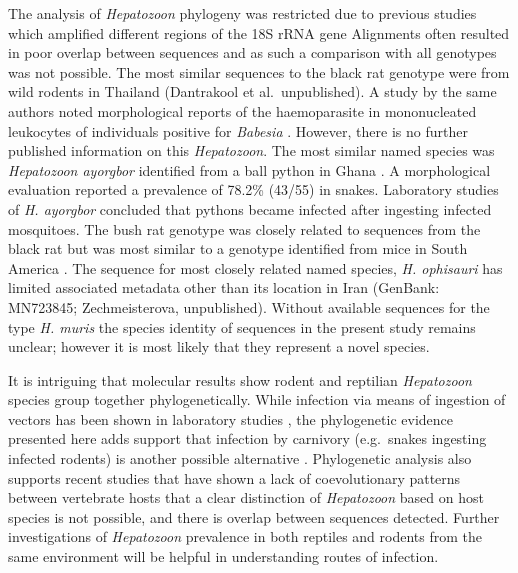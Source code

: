 \documentclass[a4paper, nobind]{templates/ociamthesis}
\begin{document}
The analysis of \emph{Hepatozoon} phylogeny was restricted due to previous studies which amplified different regions of the 18S rRNA gene
Alignments often resulted in poor overlap between sequences and as such a comparison with all genotypes was not possible.
The most similar sequences to the black rat genotype were from wild rodents in Thailand (Dantrakool et al.~unpublished).
A study by the same authors noted morphological reports of the haemoparasite in mononucleated leukocytes of individuals positive for \emph{Babesia} \autocite{dantrakoolIdentificationNewType2004}.
However, there is no further published information on this \emph{Hepatozoon}. The most similar named species was \emph{Hepatozoon ayorgbor} identified from a ball python in Ghana \autocite{slobodaNEWSPECIESHEPATOZOON2007}.
A morphological evaluation reported a prevalence of 78.2\% (43/55) in snakes.
Laboratory studies of \emph{H. ayorgbor} concluded that pythons became infected after ingesting infected mosquitoes.
The bush rat genotype was closely related to sequences from the black rat but was most similar to a genotype identified from mice in South America \autocite{merinoMolecularCharacterizationAncient2009}.
The sequence for most closely related named species, \emph{H. ophisauri} has limited associated metadata other than its location in Iran (GenBank: MN723845; Zechmeisterova, unpublished).
Without available sequences for the type \emph{H. muris} the species identity of sequences in the present study remains unclear; however it is most likely that they represent a novel species.

It is intriguing that molecular results show rodent and reptilian \emph{Hepatozoon} species group together phylogenetically.
While infection via means of ingestion of vectors has been shown in laboratory studies \autocite{slobodaNEWSPECIESHEPATOZOON2007}, the phylogenetic evidence presented here adds support that infection by carnivory (e.g.~snakes ingesting infected rodents) is another possible alternative \autocite{harrisPrevalenceDiversityHepatozoon2015}.
Phylogenetic analysis also supports recent studies that have shown a lack of coevolutionary patterns between vertebrate hosts \autocite{maiaMOLECULARASSESSMENTHEPATOZOON2014,harrisPrevalenceDiversityHepatozoon2015}
that a clear distinction of \emph{Hepatozoon} based on host species is not possible, and there is overlap between sequences detected.
Further investigations of \emph{Hepatozoon} prevalence in both reptiles and rodents from the same environment will be helpful in understanding routes of infection.
\end{document}

